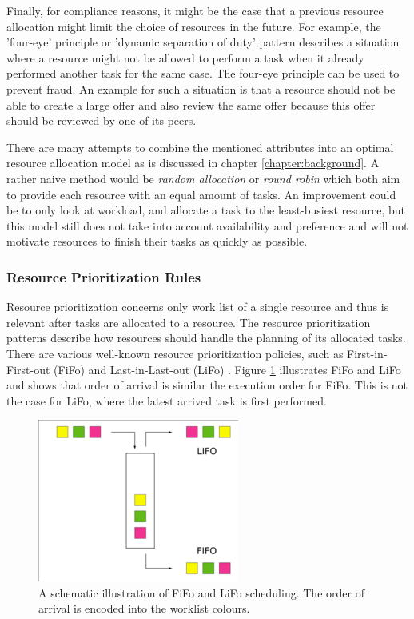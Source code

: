 Finally, for compliance reasons, it might be the case that a previous resource allocation might limit the choice of resources in the future. For example, the 'four-eye' principle or 'dynamic separation of duty' pattern \cite{rbac} describes a situation where a resource might not be allowed to perform a task when it already performed another task for the same case. The four-eye principle can be used to prevent fraud. An example for such a situation is that a resource should not be able to create a large offer and also review the same offer because this offer should be reviewed by one of its peers. 

There are many attempts to combine the mentioned attributes into an optimal resource allocation model as is discussed in chapter \ref{chapter:background}. A rather naive method would be \textit{random allocation} or \textit{round robin} which both aim to provide each resource with an equal amount of tasks. An improvement could be to only look at workload, and allocate a task to the least-busiest resource, but this model still does not take into account availability and preference and will not motivate resources to finish their tasks as quickly as possible. 

\subsubsection{Resource Prioritization Rules}
Resource prioritization concerns only work list of a single resource and thus is relevant after tasks are allocated to a resource. The resource prioritization patterns describe how resources should handle the planning of its allocated tasks. There are various well-known resource prioritization policies, such as First-in-First-out (FiFo) and Last-in-Last-out (LiFo) \cite{hofstede2009modern}. Figure \ref{fig:fifolifo} illustrates FiFo and LiFo and shows that order of arrival is similar the execution order for FiFo. This is not the case for LiFo, where the latest arrived task is first performed. 

\begin{figure}[h]
	\centering
    \includegraphics[]{figures/filo-lifo.png}
    \caption{A schematic illustration of FiFo and LiFo scheduling. The order of arrival is encoded into the worklist colours.}
    \label{fig:fifolifo}
\end{figure} 

